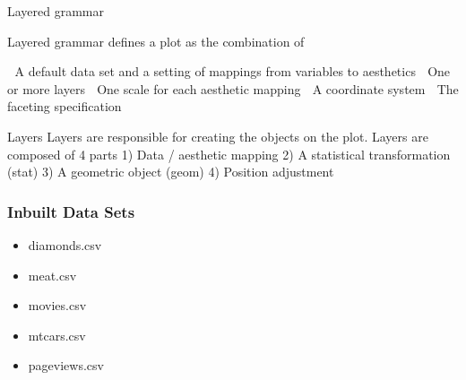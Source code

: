 Layered grammar
\begin{frame}
Layered grammar defines a plot as the combination of

 A default data set and a setting of mappings from variables to aesthetics
 One or more layers
 One scale for each aesthetic mapping
 A coordinate system
 The faceting specification
\end{frame}
\begin{frame}
Layers
Layers are responsible for creating the objects on the plot. Layers are composed of 4 parts
1) Data / aesthetic mapping
2) A statistical transformation (stat)
3) A geometric object (geom)
4) Position adjustment
\end{frame}
\begin{frame}
\frametitle{Inbuilt Data Sets}
\begin{itemize}
\item diamonds.csv	
\item meat.csv	
\item movies.csv	
\item mtcars.csv	
\item pageviews.csv
\end{itemize}

\end{frame}
